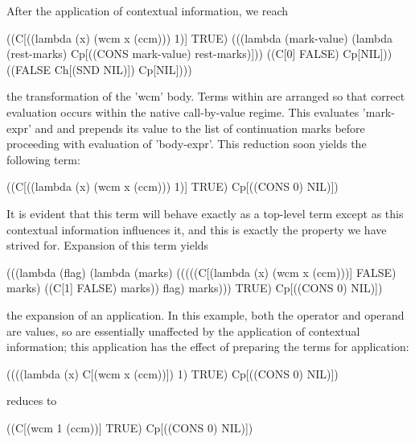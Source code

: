 After the application of contextual information, we reach
\begin{schemeblock}
\begin{schemedisplay}
((C[((lambda (x) (wcm x (ccm))) 1)] TRUE)
 (((lambda (mark-value) (lambda (rest-marks) Cp[((CONS mark-value) rest-marks)]))
   ((C[0] FALSE) Cp[NIL])) ((FALSE Ch[(SND NIL)]) Cp[NIL])))
\end{schemedisplay}
\end{schemeblock}
\noindent
the transformation of the \scheme'wcm' body. Terms within are arranged so that correct evaluation occurs within the native call-by-value regime. This evaluates \scheme'mark-expr' and and prepends its value to the list of continuation marks before proceeding with evaluation of \scheme'body-expr'. This reduction soon yields the following term:
\begin{schemeblock}
\begin{schemedisplay}
((C[((lambda (x) (wcm x (ccm))) 1)] TRUE) Cp[((CONS 0) NIL)])
\end{schemedisplay}
\end{schemeblock}
\noindent
It is evident that this term will behave exactly as a top-level term except as this contextual information influences it, and this is exactly the property we have strived for. Expansion of this term yields
\begin{schemeblock}
\begin{schemedisplay}
(((lambda (flag)
    (lambda (marks)
      (((((C[(lambda (x) (wcm x (ccm)))] FALSE) marks)
         ((C[1] FALSE) marks))
        flag)
       marks))) TRUE) Cp[((CONS 0) NIL)])
\end{schemedisplay}
\end{schemeblock}
\noindent
the expansion of an application. In this example, both the operator and operand are values, so are essentially unaffected by the application of contextual information; this application has the effect of preparing the terms for application:
\begin{schemeblock}
\begin{schemedisplay}
((((lambda (x) C[(wcm x (ccm))])
   1) TRUE) Cp[((CONS 0) NIL)])
\end{schemedisplay}
\end{schemeblock}
\noindent
reduces to
\begin{schemeblock}
\begin{schemedisplay}
((C[(wcm 1 (ccm))]
   TRUE) Cp[((CONS 0) NIL)])
\end{schemedisplay}
\end{schemeblock}

